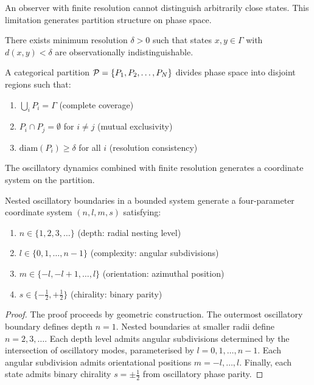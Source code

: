 An observer with finite resolution cannot distinguish arbitrarily close states. This limitation generates partition structure on phase space.

\begin{axiom}
\label{ax:resolution}
There exists minimum resolution $\delta > 0$ such that states $x, y \in \Gamma$ with $d(x, y) < \delta$ are observationally indistinguishable.
\end{axiom}

\begin{definition}
\label{def:categorical_partition}
A categorical partition $\mathcal{P} = \{P_1, P_2, \ldots, P_N\}$ divides phase space into disjoint regions such that:
\begin{enumerate}
\item $\bigcup_i P_i = \Gamma$ (complete coverage)
\item $P_i \cap P_j = \emptyset$ for $i \neq j$ (mutual exclusivity)
\item $\mathrm{diam}(P_i) \geq \delta$ for all $i$ (resolution consistency)
\end{enumerate}
\end{definition}

The oscillatory dynamics combined with finite resolution generates a coordinate system on the partition.

\begin{theorem}
\label{thm:partition_coords}
Nested oscillatory boundaries in a bounded system generate a four-parameter coordinate system $(n, l, m, s)$ satisfying:
\begin{enumerate}
\item $n \in \{1, 2, 3, \ldots\}$ (depth: radial nesting level)
\item $l \in \{0, 1, \ldots, n-1\}$ (complexity: angular subdivisions)
\item $m \in \{-l, -l+1, \ldots, l\}$ (orientation: azimuthal position)
\item $s \in \{-\frac{1}{2}, +\frac{1}{2}\}$ (chirality: binary parity)
\end{enumerate}
\end{theorem}

\begin{proof}
The proof proceeds by geometric construction. The outermost oscillatory boundary defines depth $n = 1$. Nested boundaries at smaller radii define $n = 2, 3, \ldots$. Each depth level admits angular subdivisions determined by the intersection of oscillatory modes, parameterised by $l = 0, 1, \ldots, n-1$. Each angular subdivision admits orientational positions $m = -l, \ldots, l$. Finally, each state admits binary chirality $s = \pm\frac{1}{2}$ from oscillatory phase parity.
\end{proof}


